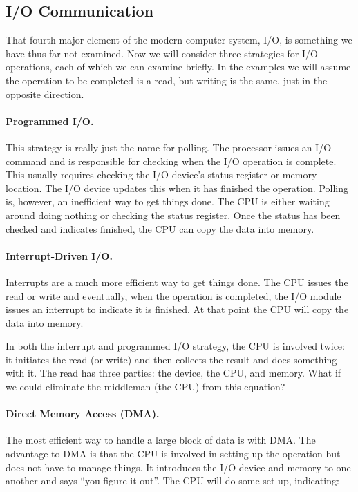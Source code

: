 \subsection*{I/O Communication}
That fourth major element of the modern computer system, I/O, is something we have thus far not examined. Now we will consider three strategies for I/O operations, each of which we can examine briefly. In the examples we will assume the operation to be completed is a read, but writing is the same, just in the opposite direction.

\paragraph{Programmed I/O.}  This strategy is really just the name for polling. The processor issues an I/O command and is responsible for checking when the I/O operation is complete. This usually requires checking the I/O device's status register or memory location. The I/O device updates this when it has finished the operation. Polling is, however, an inefficient way to get things done. The CPU is either waiting around doing nothing or checking the status register. Once the status has been checked and indicates finished, the CPU can copy the data into memory.

\paragraph{Interrupt-Driven I/O.} Interrupts are a much more efficient way to get things done. The CPU issues the read or write and eventually, when the operation is completed, the I/O module issues an interrupt to indicate it is finished. At that point the CPU will copy the data into memory.

In both the interrupt and programmed I/O strategy, the CPU is involved twice: it initiates the read (or write) and then collects the result and does something with it. The read has three parties: the device, the CPU, and memory. What if we could eliminate the middleman (the CPU) from this equation?

\paragraph{Direct Memory Access (DMA).} The most efficient way to handle a large block of data is with DMA. The advantage to DMA is that the CPU is involved in setting up the operation but does not have to manage things. It introduces the I/O device and memory to one another and says ``you figure it out''. The CPU will do some set up, indicating:

